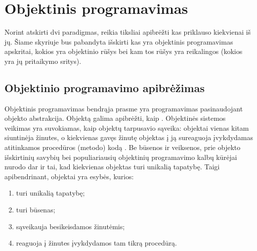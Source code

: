 \chapter{Objektinis programavimas}

Norint atskirti dvi paradigmas, reikia tiksliai apibrėžti kas priklauso
kiekvienai iš jų. Šiame skyriuje bus pabandyta išskirti kas yra
objektinis programavimas apskritai, kokios yra objektinio
rūšys bei kam tos rūšys yra reikalingos (kokios yra jų
pritaikymo sritys).

\section{Objektinio programavimo apibrėžimas}

Objektinis programavimas bendrąja prasme yra programavimas
pasinaudojant objekto abstrakcija. Objektą galima apibrėžti, kaip
\cite[41]{OOP-themes-and-variations}. Objektinės sistemos veikimas
yra suvokiamas, kaip objektų tarpusavio sąveika: objektai vienas kitam
siuntinėja žinutes, o kiekvienas gavęs žinutę objektas į ją sureaguoja
įvykdydamas atitinkamos procedūros (metodo)
kodą\cite[41]{OOP-themes-and-variations}%
\cite[277]{concepts-in-programming-languages}%
\cite[168]{Wegner:1987:DOL:38807.38823}.
Be būsenos ir veiksenos, prie objekto išskirtinių savybių 
\cite[37]{cs-beyond-object-oriented-programming} bei
populiariausių objektinių programavimo kalbų kūrėjai nurodo
dar ir tai, kad kiekvienas objektas turi unikalią tapatybę.
Taigi apibendrinant, objektai yra esybės, kurios:
\begin{enumerate}
  \item turi unikalią tapatybę;
  \item turi būsenas;
  \item sąveikauja besikeisdamos žinutėmis;
  \item reaguoja į žinutes įvykdydamos tam tikrą procedūrą.
\end{enumerate}

